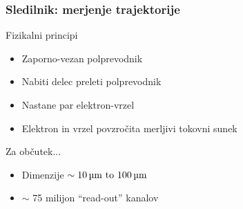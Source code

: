 \documentclass[14pt, t]{beamer}
\begin{document}
\begin{frame}
    \frametitle{Sledilnik: merjenje trajektorije}
    
    Fizikalni principi
    \begin{itemize}

     	\item Zaporno-vezan polprevodnik
        \item Nabiti delec preleti polprevodnik
        \item Nastane par elektron-vrzel
        \item Elektron in vrzel povzročita merljivi tokovni sunek

    \end{itemize}
    \vspace{5mm}

    \pause
    Za občutek...
    \begin{itemize}
    

        \item Dimenzije $ \sim \text{\SIrange{10}{100}{\micro \meter}} $

        \item $ \sim $ 75 milijon ``read-out'' kanalov

    \end{itemize}
    
\end{frame}
\end{document}
